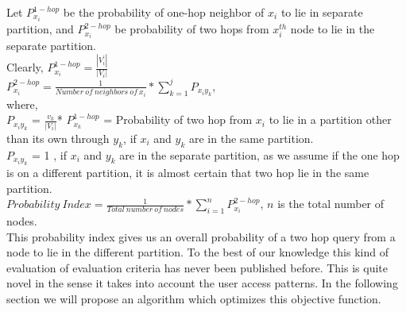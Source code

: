 \documentclass[letterpaper]{article}
\begin{document}
        Let $P_{x_i}^{1-hop}$ be the probability of one-hop neighbor of $x_i$ to lie in separate partition, and $P_{x_i}^{2-hop}$ be probability of two hops from $x_i^{th}$ node to lie in the separate partition.\\
        Clearly, $P_{x_i}^{1-hop}= \frac{|V_i^\prime|}{|V_i|}$ \\
        $P_{x_i}^{2-hop}=\frac{1}{Number\ of\ neighbors\ of\ x_i} * \displaystyle\sum_{k=1}^j P_{x_i y_k}$, \\
        where,\\
        $P_{x_i y_k}$ = $\frac{v_k}{|V_i|}$* $P_{x_{k}}^{1-hop}$ =  Probability of two hop from  $x_{i}$ to lie  in a  partition other than  its own through $y_k$, if $x_i$ and $y_{k}$ are in the same partition.\\
        $P_{x_i y_k}$ =  1 , if $x_i$ and $y_k$ are in the separate partition, as we assume if the one hop is on a different partition, it is almost
certain that two hop lie in the same partition.\\
        $Probability\ Index=\frac{1}{Total\ number\ of\ nodes}*\displaystyle\sum_{i=1}^nP_{x_i}^{2-hop}$, $n$ is the total number of nodes.\\


        This probability index gives us an overall probability of a two hop
query from a node to lie in the different partition. To the best of our
knowledge this kind of evaluation of evaluation criteria has never been
published before. This is quite novel in the sense it takes into account the
user access patterns.  In the following section we will propose an algorithm
which optimizes this objective function.
\end{document}
